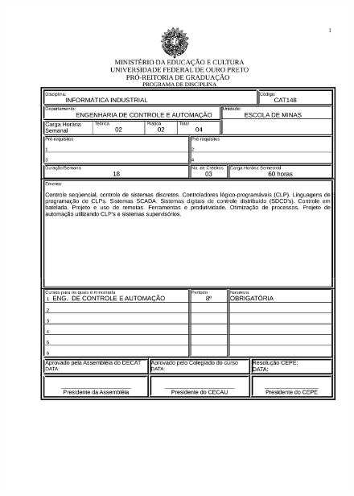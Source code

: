 \begin{figure}[p]
	\centering 
	\includegraphics[scale=0.7]{capitulos/anexo1-programas-disciplina/p72.pdf}
\end{figure}

